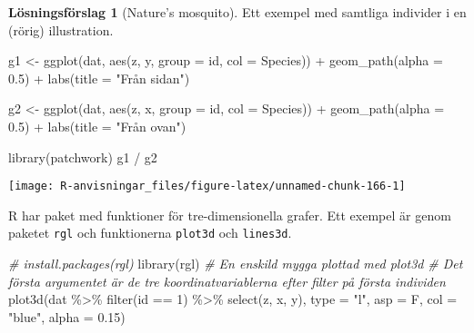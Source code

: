 \documentclass[
]{book}
\newenvironment{Shaded}{\begin{snugshade}}{\end{snugshade}}
\newcommand{\AttributeTok}[1]{\textcolor[rgb]{0.77,0.63,0.00}{#1}}
\newcommand{\CommentTok}[1]{\textcolor[rgb]{0.56,0.35,0.01}{\textit{#1}}}
\newcommand{\DecValTok}[1]{\textcolor[rgb]{0.00,0.00,0.81}{#1}}
\newcommand{\FloatTok}[1]{\textcolor[rgb]{0.00,0.00,0.81}{#1}}
\newcommand{\FunctionTok}[1]{\textcolor[rgb]{0.00,0.00,0.00}{#1}}
\newcommand{\NormalTok}[1]{#1}
\newcommand{\OtherTok}[1]{\textcolor[rgb]{0.56,0.35,0.01}{#1}}
\newcommand{\SpecialCharTok}[1]{\textcolor[rgb]{0.00,0.00,0.00}{#1}}
\newcommand{\StringTok}[1]{\textcolor[rgb]{0.31,0.60,0.02}{#1}}
\theoremstyle{definition}
\theoremstyle{definition}
\theoremstyle{definition}
\theoremstyle{definition}
\newtheorem{hypothesis}{Lösningsförslag}[chapter]
\theoremstyle{remark}
\begin{document}
\begin{hypothesis}[Nature's mosquito]
Ett exempel med samtliga individer i en (rörig) illustration.

\begin{Shaded}
\begin{Highlighting}[]
\NormalTok{g1 }\OtherTok{\textless{}{-}} \FunctionTok{ggplot}\NormalTok{(dat, }\FunctionTok{aes}\NormalTok{(z, y, }\AttributeTok{group =}\NormalTok{ id, }\AttributeTok{col =}\NormalTok{ Species)) }\SpecialCharTok{+} 
  \FunctionTok{geom\_path}\NormalTok{(}\AttributeTok{alpha =} \FloatTok{0.5}\NormalTok{) }\SpecialCharTok{+}
  \FunctionTok{labs}\NormalTok{(}\AttributeTok{title =} \StringTok{"Från sidan"}\NormalTok{)}

\NormalTok{g2 }\OtherTok{\textless{}{-}} \FunctionTok{ggplot}\NormalTok{(dat, }\FunctionTok{aes}\NormalTok{(z, x, }\AttributeTok{group =}\NormalTok{ id, }\AttributeTok{col =}\NormalTok{ Species)) }\SpecialCharTok{+} 
  \FunctionTok{geom\_path}\NormalTok{(}\AttributeTok{alpha =} \FloatTok{0.5}\NormalTok{) }\SpecialCharTok{+}
  \FunctionTok{labs}\NormalTok{(}\AttributeTok{title =} \StringTok{"Från ovan"}\NormalTok{)}

\FunctionTok{library}\NormalTok{(patchwork)}
\NormalTok{g1 }\SpecialCharTok{/}\NormalTok{ g2}
\end{Highlighting}
\end{Shaded}

\begin{center}\texttt{[image: R-anvisningar\_files/figure-latex/unnamed-chunk-166-1]} \end{center}

R har paket med funktioner för tre-dimensionella grafer. Ett exempel är genom paketet \texttt{rgl} och funktionerna \texttt{plot3d} och \texttt{lines3d}.

\begin{Shaded}
\begin{Highlighting}[]
\CommentTok{\# install.packages(rgl)}
\FunctionTok{library}\NormalTok{(rgl)}
\CommentTok{\# En enskild mygga plottad med plot3d}
\CommentTok{\# Det första argumentet är de tre koordinatvariablerna efter filter på första individen}
\FunctionTok{plot3d}\NormalTok{(dat }\SpecialCharTok{\%\textgreater{}\%} \FunctionTok{filter}\NormalTok{(id }\SpecialCharTok{==} \DecValTok{1}\NormalTok{) }\SpecialCharTok{\%\textgreater{}\%} \FunctionTok{select}\NormalTok{(z, x, y), }\AttributeTok{type =} \StringTok{"l"}\NormalTok{, }\AttributeTok{asp =}\NormalTok{ F, }\AttributeTok{col =} \StringTok{"blue"}\NormalTok{, }\AttributeTok{alpha =} \FloatTok{0.15}\NormalTok{)}


\end{Highlighting}
\end{Shaded}
\end{hypothesis}
\end{document}
